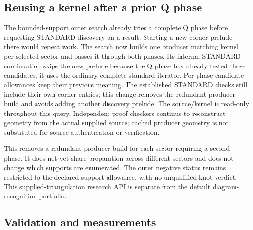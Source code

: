 \subsection{Reusing a kernel after a prior Q phase}

The bounded-support outer search already tries a complete Q phase before
requesting STANDARD discovery on a  result.
Starting a new corner prelude there would repeat work. The search now builds
one producer matching kernel per selected sector and passes it through
both phases. Its internal STANDARD continuation skips the new prelude
because the Q phase has already tested those candidates; it uses the
ordinary complete standard iterator. Per-phase candidate allowances keep
their previous meaning. The established STANDARD checks still include
their own corner entries; this change removes the redundant producer build
and avoids adding another discovery prelude. The source/kernel is read-only throughout this
query. Independent proof checkers continue to reconstruct geometry from
the actual supplied source; cached producer geometry is not substituted
for source authentication or verification.

This removes a redundant producer build for each sector requiring a
second phase. It does not yet share preparation across different sectors
and does not change which supports are enumerated. The outer negative
status remains restricted to the declared support allowance, with no
unqualified knot verdict. This supplied-triangulation research API is
separate from the default diagram-recognition portfolio.

\subsection{Validation and measurements}

